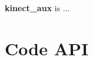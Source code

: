 

{\bfseries kinect\-\_\-aux} is ...\hypertarget{index_codeapi}{}\section{\-Code A\-P\-I}\label{index_codeapi}
